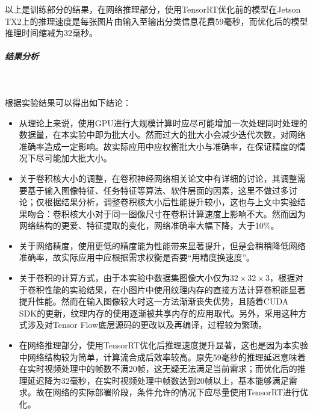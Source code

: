 \par 以上是训练部分的结果，在网络推理部分，使用TensorRT优化前的模型在Jetson TX2上的推理速度是每张图片由输入至输出分类信息花费59毫秒，而优化后的模型推理时间缩减为32毫秒。
\subparagraph{结果分析}~{}
\par 根据实验结果可以得出如下结论：
\begin{itemize}
	\item 从理论上来说，使用GPU进行大规模计算时应尽可能增加一次处理同时处理的数据量，在本实验中即为批大小。然而过大的批大小会减少迭代次数，对网络准确率造成一定影响。故实际应用中应权衡批大小与准确率，在保证精度的情况下尽可能加大批大小。
	\item 关于卷积核大小的调整，在卷积神经网络相关论文中有详细的讨论，其调整需要基于输入图像特征、任务特征等算法、软件层面的因素，这里不做过多讨论；仅根据结果分析，调整卷积核大小后性能提升较小，这也与上文中实验结果吻合：卷积核大小对于同一图像尺寸在卷积计算速度上影响不大。然而因为网络结构的更爱、特征提取的变化，网络准确率大幅下降，大于10\%。
	\item 关于网络精度，使用更低的精度能为性能带来显著提升，但是会稍稍降低网络准确率，故实际应用中应根据需求权衡是否要“用精度换速度”。
	\item 关于卷积的计算方式，由于本实验中数据集图像大小仅为$ 32\times 32\times 3 $，根据对于卷积性能的实验结果，在小图片中使用纹理内存的直接方法计算卷积能显著提升性能。然而在输入图像较大时这一方法渐渐丧失优势，且随着CUDA SDK的更新，纹理内存的使用逐渐被共享内存的应用取代。另外，采用这种方式涉及对Tensor Flow底层源码的更改以及再编译，过程较为繁琐。
	\item 在网络推理部分，使用TensorRT优化后推理速度提升显著，这也是因为本实验中网络结构较为简单，计算流合成后效率较高。原先59毫秒的推理延迟意味着在实时视频处理中的帧数不满20帧，这无疑无法满足当前需求；而优化后的推理延迟降为32毫秒，在实时视频处理中帧数达到20帧以上，基本能够满足需求。故在网络的实际部署阶段，条件允许的情况下应尽量使用TensorRT进行优化。
\end{itemize}

